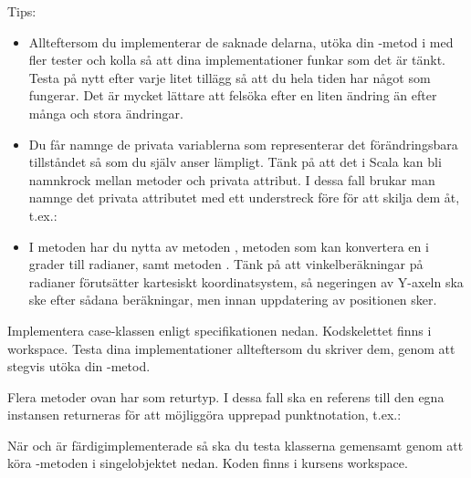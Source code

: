 \noindent Tips:

\begin{itemize}
\item Allteftersom du implementerar de saknade delarna, utöka din -metod i  med fler tester och kolla så att dina implementationer funkar som det är tänkt. Testa på nytt efter varje litet tillägg så att du hela tiden har något som fungerar. Det är mycket lättare att felsöka efter en liten ändring än efter många och stora ändringar.

\item Du får namnge de privata variablerna som representerar det förändringsbara tillståndet så som du själv anser lämpligt. Tänk på att det i Scala kan bli namnkrock mellan metoder och privata attribut. I dessa fall brukar man namnge det privata attributet med ett understreck före för att skilja dem åt, t.ex.: \\

\item I metoden  har du nytta av metoden , metoden  som kan konvertera en  i grader till radianer, samt metoden . Tänk på att vinkelberäkningar på radianer förutsätter kartesiskt koordinatsystem, så negeringen av Y-axeln ska ske efter sådana beräkningar, men innan uppdatering av positionen sker. 
\end{itemize}


\Task Implementera case-klassen  enligt specifikationen nedan. Kodskelettet finns i workspace. Testa dina implementationer allteftersom du skriver dem, genom att stegvis utöka din -metod.


\noindent Flera metoder ovan har  som returtyp. I dessa fall ska en referens till den egna instansen returneras för att möjliggöra upprepad punktnotation, t.ex.:\\


\clearpage

\Task\Checkpoint När  och  är färdigimplementerade så ska du testa klasserna gemensamt genom att köra -metoden i singelobjektet  nedan. Koden finns i kursens workspace. 

